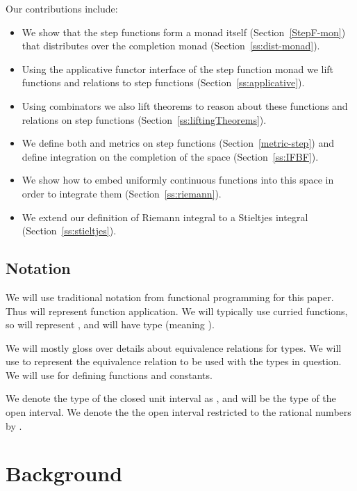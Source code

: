 \documentclass{elsarticle}
\begin{document}
Our contributions include:
\begin{itemize}
  \item We show that the step functions form a monad itself
  (Section~\ref{StepF-mon}) that distributes over the completion monad
  (Section~\ref{ss:dist-monad}).
  
  \item Using the applicative functor interface of the step function monad we
  lift functions and relations to step functions
  (Section~\ref{ss:applicative}).
  
  \item Using combinators we also lift theorems to reason about these
  functions and relations on step functions
  (Section~\ref{ss:liftingTheorems}).
  
  \item We define both  and  metrics on step functions
  (Section~\ref{metric-step}) and define integration on the completion of the
   space (Section~\ref{ss:IFBF}).
  
  \item We show how to embed uniformly continuous functions into this space in
  order to integrate them (Section~\ref{ss:riemann}).
  
  \item We extend our definition of Riemann integral to a Stieltjes integral
  (Section~\ref{ss:stieltjes}).
\end{itemize}
\subsection{Notation}We will use traditional notation from functional
programming for this paper. Thus  will represent function application. We
will typically use curried functions, so  will represent , and
 will have type  (meaning ).

We will mostly gloss over details about equivalence relations for types. We
will use  to represent the equivalence relation to be used with the
types in question. We will use for defining functions and constants.

We denote the type of the closed unit interval as , and 
will be the type of the open interval. We denote the the open interval
restricted to the rational numbers by .

\section{Background}
\end{document}
